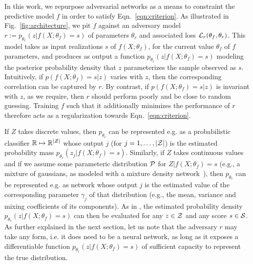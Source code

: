 \documentclass[twocolumn,superscriptaddress,aps]{revtex4-1}
\theoremstyle{plain}
\begin{document}
In this work, we repurpose adversarial networks as a means to constraint the
predictive model $f$ in order to satisfy Eqn.~\ref{eqn:criterion}. As
illustrated in Fig.~\ref{fig:architecture}, we pit $f$ against an adversary
model $r := p_{\theta_r}(z | f(X;\theta_f)=s)$ of parameters $\theta_r$ and
associated loss ${\cal L}_r(\theta_f, \theta_r)$. This model takes  as input
realizations $s$ of $f(X; \theta_f)$, for the current value $\theta_f$ of $f$
parameters, and produces as output a function $p_{\theta_r}(z | f(X;\theta_f)=s)$
modeling the posterior probability density that $z$ parameterizes the sample
observed as $s$.
Intuitively, if $p(f(X; \theta_f)=s|z)$ varies with $z$,
then the corresponding correlation can be captured by $r$. By contrast, if
$p(f(X; \theta_f)=s|z)$ is invariant with $z$, as we require, then $r$ should
perform poorly and be close to random guessing. Training $f$ such that it
additionally minimizes the performance of $r$ therefore acts as a regularization
towards Eqn.~\ref{eqn:criterion}.

If $Z$ takes discrete values, then $p_{\theta_r}$ can be represented e.g. as a
probabilistic classifier $\mathbb{R} \mapsto \mathbb{R}^{|{\cal Z|}}$ whose
output $j$ (for $j=1, \dots, |{\cal Z}|$) is the estimated probability mass
$p_{\theta_r}(z_j|f(X;\theta_f)=s)$. Similarly, if $Z$ takes continuous values and
if we assume some parameteric distribution ${\cal P}$ for $Z|f(X;\theta_f)=s$
(e.g., a mixture of gaussians, as modeled with a mixture
density network~\citep{bishop1994mixture}), then $p_{\theta_r}$ can be
represented e.g. as network whose output $j$ is the estimated value of the
corresponding parameter $\gamma_j$ of that distribution (e.g., the mean,
variance and mixing coefficients of its components). As in
\citep{nix1994estimating,bishop1994mixture}, the estimated probability density
$p_{\theta_r}(z|f(X;\theta_f)=s)$ can then be evaluated for any $z \in {\cal Z}$ and any score $s \in {\cal S}$.
As further explained in the next section, let us note that the adversary $r$ may
take any form, i.e. it does need to be a neural network, as long as it exposes a
differentiable function $p_{\theta_r}(z|f(X;\theta_f)=s)$ of sufficient capacity
to represent the true distribution.
\end{document}
